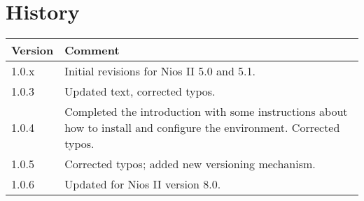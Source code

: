\chapter{History}

\begin{tabular}{|p{}|p{}|}
\hline 
Version&
Comment\tabularnewline
\hline
\hline 
1.0.x&
Initial revisions for Nios II 5.0 and 5.1.\tabularnewline
\hline 
1.0.3&
Updated text, corrected typos.\tabularnewline 
\hline 
1.0.4&
Completed the introduction with some instructions about how to install and configure the environment. Corrected typos.\tabularnewline 
\hline 
1.0.5&
Corrected typos; added new versioning mechanism.\tabularnewline \hline
1.0.6&
Updated for Nios II version 8.0.\tabularnewline \hline
\end{tabular}
